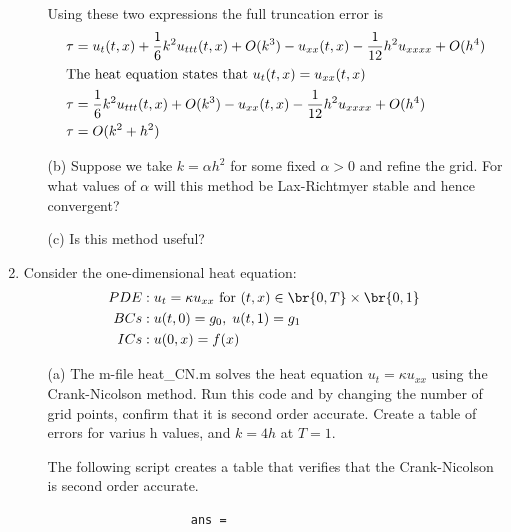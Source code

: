 \documentclass[11pt, oneside, titlepage]{article}
\begin{document}
\begin{enumerate}
\begin{enumerate}
                Using these two expressions the full truncation error is
                \begin{align*}
                    \tau &= u_t(t, x) + \frac{1}{6}k^2 u_{ttt}(t, x) + O(k^3) - u_{xx}(t, x) - \frac{1}{12} h^2 u_{xxxx} + O(h^4) \\
                    \intertext{The heat equation states that $u_t(t, x) = u_{xx}(t, x)$}
                    \tau &= \frac{1}{6}k^2 u_{ttt}(t, x) + O(k^3) - u_{xx}(t, x) - \frac{1}{12} h^2 u_{xxxx} + O(h^4) \\
                    \tau &= O(k^2 + h^2)
                \end{align*}

            \item[(b)]
                Suppose we take $k = \alpha h^2$ for some fixed $\alpha > 0$
                and refine the grid.
                For what values of $\alpha$ will this method be Lax-Richtmyer
                stable and hence convergent?

            \item[(c)]
                Is this method useful?
        \end{enumerate}

    \item %
        Consider the one-dimensional heat equation:
        \begin{align*}
            PDE &: u_t = \kappa u_{xx}\text{ for } (t, x) \in \br{0, T} \times \br{0, 1} \\
            BCs &: u(t, 0) = g_0, \; u(t, 1) = g_1 \\
            ICs &: u(0, x) = f(x)
        \end{align*}
        \begin{enumerate}
            \item[(a)] %
                The m-file heat\_CN.m solves the heat equation
                $u_t = \kappa u_{xx}$ using the Crank-Nicolson method.
                Run this code and by changing the number of grid points,
                confirm that it is second order accurate.
                Create a table of errors for varius h values, and $k = 4h$ at
                $T = 1$.

                The following script creates a table that verifies that the
                Crank-Nicolson is second order accurate.
                
                \begin{verbatim}
                    ans = 


\end{verbatim}
\end{enumerate}
\end{enumerate}
\end{document}
